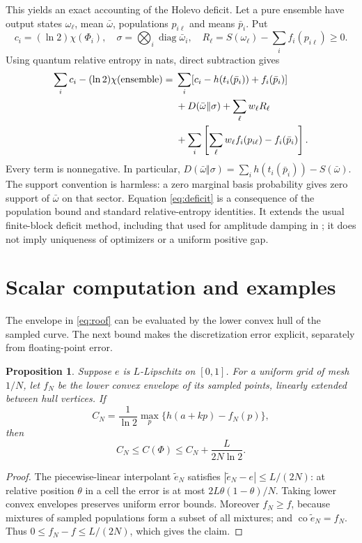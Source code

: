\documentclass[11pt]{article}
\newtheorem{proposition}[theorem]{Proposition}
\newcommand{\co}{\operatorname{co}}
\begin{document}
This yields an exact accounting of the Holevo deficit. Let a pure ensemble have output states $\omega_\ell$, mean $\bar\omega$, populations $p_{i\ell}$ and means $\bar p_i$. Put
\[
 c_i=(\ln2)\chi(\Phi_i),\quad
 \sigma=\bigotimes_i\operatorname{diag}\bar\omega_i,\quad
 R_\ell=S(\omega_\ell)-\sum_i f_i(p_{i\ell})\ge0.
\]
Using quantum relative entropy in nats, direct subtraction gives
\begin{align}\label{eq:deficit}
 \sum_i c_i-(\ln2)\chi(\text{ensemble})
 ={}&\sum_i[c_i-h(t_i(\bar p_i))+f_i(\bar p_i)]\notag\\
 &+D(\bar\omega\Vert\sigma)+\sum_\ell w_\ell R_\ell\\
 &+\sum_i\left[\sum_\ell w_\ell f_i(p_{i\ell})-f_i(\bar p_i)\right].\notag
\end{align}
Every term is nonnegative. In particular,
$D(\bar\omega\Vert\sigma)=\sum_i h(t_i(\bar p_i))-S(\bar\omega)$.
The support convention is harmless: a zero marginal basis probability gives zero support of $\bar\omega$ on that sector. Equation \eqref{eq:deficit} is a consequence of the population bound and standard relative-entropy identities. It extends the usual finite-block deficit method, including that used for amplitude damping in \cite{tang}; it does not imply uniqueness of optimizers or a uniform positive gap.

\section{Scalar computation and examples}\label{sec:examples}
The envelope in \eqref{eq:roof} can be evaluated by the lower convex hull of the sampled curve. The next bound makes the discretization error explicit, separately from floating-point error.

\begin{proposition}\label{prop:grid}
Suppose $e$ is $L$-Lipschitz on $[0,1]$. For a uniform grid of mesh $1/N$, let $f_N$ be the lower convex envelope of its sampled points, linearly extended between hull vertices. If
\[
 C_N=\frac1{\ln2}\max_p\{h(a+kp)-f_N(p)\},
\]
then
\[
 C_N\le C(\Phi)\le C_N+\frac{L}{2N\ln2}.
\]
\end{proposition}
\begin{proof}
The piecewise-linear interpolant $\widetilde e_N$ satisfies
$|\widetilde e_N-e|\le L/(2N)$: at relative position $\theta$ in a cell the error is at most $2L\theta(1-\theta)/N$.
Taking lower convex envelopes preserves uniform error bounds. Moreover $f_N\ge f$, because mixtures of sampled populations form a subset of all mixtures; and $\co\widetilde e_N=f_N$. Thus
$0\le f_N-f\le L/(2N)$, which gives the claim.
\end{proof}
\end{document}
